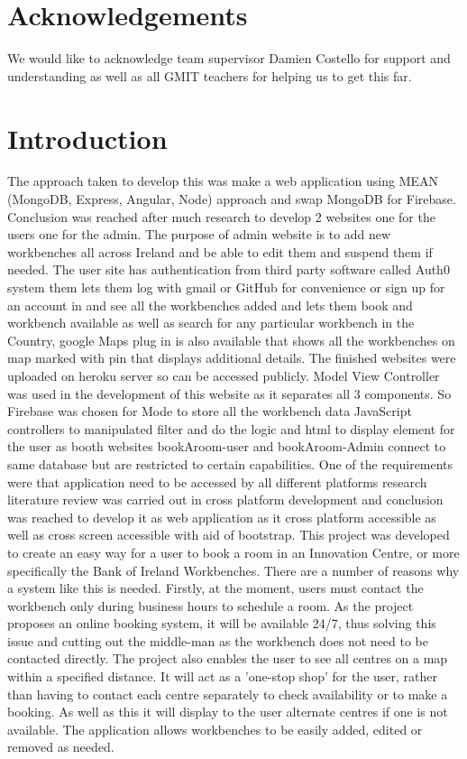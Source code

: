 \pagebreak

\chapter*{Acknowledgements}
We would like to acknowledge team supervisor Damien Costello for support and understanding as well as all GMIT teachers for helping us to get this far.
\pagebreak


\chapter{Introduction}
\bigbreak

The approach taken to develop this was make a web application using MEAN (MongoDB, Express, Angular, Node) approach and swap MongoDB for Firebase. Conclusion was reached after much research to develop 2 websites one for the users one for the admin. The purpose of admin website is to add new workbenches all across Ireland and be able to edit them and suspend them if needed. The user site has authentication from third party software called Auth0 system them lets them log with gmail or GitHub for convenience or sign up for an account in and see all the workbenches added and lets them book and workbench available as well as search for any particular workbench in the Country, google Maps plug in is also available that shows all the workbenches on map marked with pin that displays additional details. The finished websites were uploaded on heroku server so can be accessed publicly.
Model View Controller was used in the development of this website as it separates all 3 components. So Firebase was chosen for Mode to store all the workbench data JavaScript controllers to manipulated  filter and do the logic and html to display element for the user as booth  websites bookAroom-user and bookAroom-Admin connect to same database but are restricted to certain capabilities. One of the requirements were that application need to be accessed by all different platforms research literature review was carried out in cross platform development and conclusion was reached to develop it as web application as it cross platform accessible as well as cross screen accessible with aid of bootstrap.
This project was developed to create an easy way for a user to book a room in an Innovation Centre, or more specifically the Bank of Ireland Workbenches. There are a number of reasons why a system like this is needed.
Firstly, at the moment, users must contact the workbench only during business hours to schedule a room. As the project proposes an online booking system, it will be available 24/7, thus solving this issue and cutting out the middle-man as the workbench does not need to be contacted directly.
The project also enables the user to see all centres on a map within a specified distance. It will act as a 'one-stop shop' for the user, rather than having to contact each centre separately to check availability or to make a booking. As well as this it will display to the user alternate centres if one is not available. The application allows workbenches to be easily added, edited or removed as needed.



